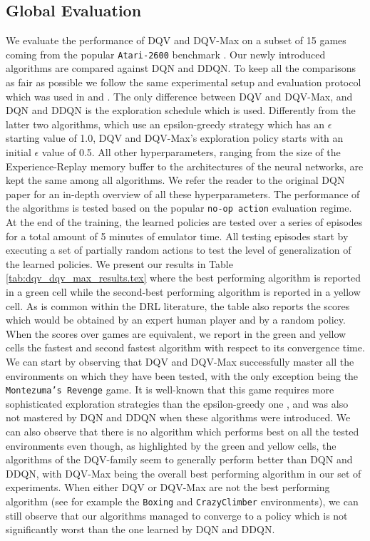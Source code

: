 \subsection{Global Evaluation}
\label{sec:global_evaluation}

We evaluate the performance of DQV and DQV-Max on a subset of 15 games coming from the popular \texttt{Atari-2600} benchmark \cite{bellemare2013arcade}. Our newly introduced algorithms are compared against DQN and DDQN. To keep all the comparisons as fair as possible we follow the same experimental setup and evaluation protocol which was used in \cite{mnih2015human} and \cite{van2016deep}. The only difference between DQV and DQV-Max, and DQN and DDQN is the exploration schedule which is used. Differently from the latter two algorithms, which use an epsilon-greedy strategy which has an $\epsilon$ starting value of 1.0, DQV and DQV-Max's exploration policy starts with an initial $\epsilon$ value of 0.5. All other hyperparameters, ranging from the size of the Experience-Replay memory buffer to the architectures of the neural networks, are kept the same among all algorithms. We refer the reader to the original DQN paper \cite{mnih2015human} for an in-depth overview of all these hyperparameters. The performance of the algorithms is tested based on the popular \texttt{no-op action} evaluation regime. At the end of the training, the learned policies are tested over a series of episodes for a total amount of 5 minutes of emulator time. All testing episodes start by executing a set of partially random actions to test the level of generalization of the learned policies. We present our results in Table \ref{tab:dqv_dqv_max_results.tex} where the best performing algorithm is reported in a green cell while the second-best performing algorithm is reported in a yellow cell. As is common within the DRL literature, the table also reports the scores which would be obtained by an expert human player and by a random policy. When the scores over games are equivalent, we report in the green and yellow cells the fastest and second fastest algorithm with respect to its convergence time. We can start by observing that DQV and DQV-Max successfully master all the environments on which they have been tested, with the only exception being the \texttt{Montezuma's Revenge} game. It is well-known that this game requires more sophisticated exploration strategies than the epsilon-greedy one \cite{fortunato2017noisy}, and was also not mastered by DQN and DDQN when these algorithms were introduced. We can also observe that there is no algorithm which performs best on all the tested environments even though, as highlighted by the green and yellow cells, the algorithms of the DQV-family seem to generally perform better than DQN and DDQN, with DQV-Max being the overall best performing algorithm in our set of experiments. When either DQV or DQV-Max are not the best performing algorithm (see for example the \texttt{Boxing} and \texttt{CrazyClimber} environments), we can still observe that our algorithms managed to converge to a policy which is not significantly worst than the one learned by DQN and DDQN.
